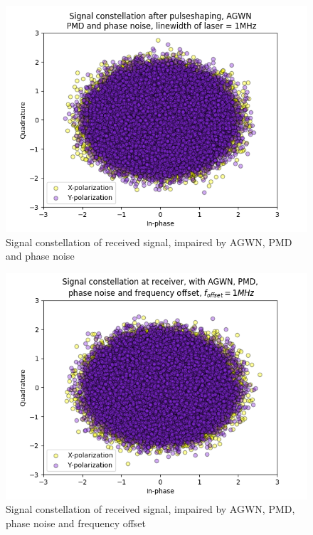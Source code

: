 \documentclass[journal,10pt,twoside, a4paper]{IEEEtran}
\begin{document}
\begin{figure}
    \centering
    \includegraphics[width=\linewidth]{Thesis/images/sig_agwn_pmd_phase}
    \caption{Signal constellation of received signal, impaired by AGWN, PMD and phase noise}
    \label{fig:sig_agwn_pmd_phase}
\end{figure}

\begin{figure}
    \centering
    \includegraphics[width=\linewidth]{Thesis/images/sig_agwn_pmd_phase_freq}
    \caption{Signal constellation of received signal, impaired by AGWN, PMD, phase noise and frequency offset}
    \label{fig:sig_agwn_pmd_phase_freq}
\end{figure}
\end{document}
